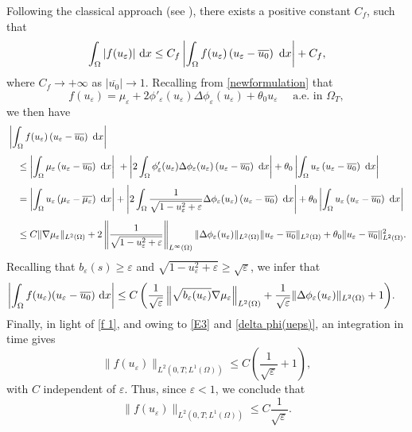 \documentclass[11pt,  reqno]{amsart}%
\theoremstyle{plain}
\theoremstyle{definition}
\theoremstyle{remark}
\numberwithin{equation}{section}
\newcommand{\ve}{\varepsilon}
\newcommand{\dx}{\textup{d}x}
\begin{document}
Following the classical approach (see \cite{MZ2004}), there exists a positive constant $C_f$, such that
\begin{equation}
    \label{f 1}
    \int_\Omega |f(u_\ve)| \ \dx \le C_f \left| \int_\Omega f(u_\ve) \left(u_\ve-\overline{u_0} \right)\ \dx \right|+C_f,
\end{equation}
where $C_f \to + \infty$ as $|\overline{u_0}|\to 1$.
Recalling from \eqref{newformulation} that
$$f(u_\ve)= \mu_\ve + 2 \phi'_\ve(u_\ve)\Delta \phi_\ve(u_\ve) + \theta_0u_\ve\quad \mbox{ a.e. in }\Omega_T,$$
we then have
\begin{align*}
    &\left| \int_\Omega f(u_\ve) \left(u_\ve-\overline{u_0} \right) \ \dx \right|
    \\[3pt]
    &\quad 
    \le \left| \int_\Omega \mu_\ve\left(u_\ve-\overline{u_0} \right) \ \dx \right|\ 
    + \left| 2\int_\Omega \phi'_\ve(u_\ve)\Delta \phi_\ve(u_\ve) \left(u_\ve-\overline{u_0} \right) \ \dx \right|
    + \theta_0\left|  \int_\Omega u_\ve \left(u_\ve-\overline{u_0} \right) \ \dx  \right
    |\\[3pt]
    &\quad 
    = \left| \int_\Omega u_\ve \left( \mu_\ve-\overline{\mu_\ve} \right) \ \dx 
    \right| + \left| 2\int_\Omega \dfrac{1}{\sqrt{1-u^2_\ve+\ve}}\Delta \phi_\ve(u_\ve) \left(u_\ve-\overline{u_0} \right) \ \dx \right|
    +\theta_0 \left| \int_\Omega u_\ve \left(u_\ve-\overline{u_0} \right) \ \dx  \right|
    \\[3pt]
    &\quad \le C \|\nabla \mu_\ve \|_{L^2(\Omega)}
    +2 \left\| \dfrac{1}{\sqrt{1-u^2_\ve+\ve}} \right\|_{L^\infty(\Omega)} 
    \|\Delta \phi_\ve(u_\ve)\|_{L^2(\Omega)} 
    \|u_\ve - \overline{u_0}\|_{L^2(\Omega)}
    + \theta_0 \|u_\ve - \overline{u_0}\|^2_{L^2(\Omega)}.
\end{align*}
Recalling that $b_\ve(s) \ge \ve$ and $\sqrt{1-u^2_\ve+\ve} \geq \sqrt{\ve}$, we infer that
\begin{align*}
    \left| \int_\Omega f(u_\ve)(u_\ve-\overline{u_0}) \ \dx \right|
    &\le C\left(\dfrac{1}{\sqrt{\ve}} \left\|\sqrt{b_\ve(u_\ve)}\nabla \mu_\ve \right\|_{L^2(\Omega)}+ \dfrac{1}{\sqrt{\ve}}\|\Delta \phi_\ve(u_\ve)\|_{L^2(\Omega)}+1\right)\!.
\end{align*}
Finally, in light of \eqref{f 1}, and owing to  \eqref{E3} and \eqref{delta phi(ueps)}, an integration in time gives
$$ 
\|f(u_\ve)\|_{L^2(0,T; L^1(\Omega))}\le C\left(\dfrac{1}{\sqrt{\ve}}+1\right)\!,
$$
with $C$ independent of $\ve$. Thus, since $\ve<1$, we conclude that
\begin{equation}
    \label{f L1}
     \|f(u_\ve)\|_{L^2(0,T; L^1(\Omega))}\le C\dfrac{1}{\sqrt{\ve}}.
\end{equation}
\end{document}
